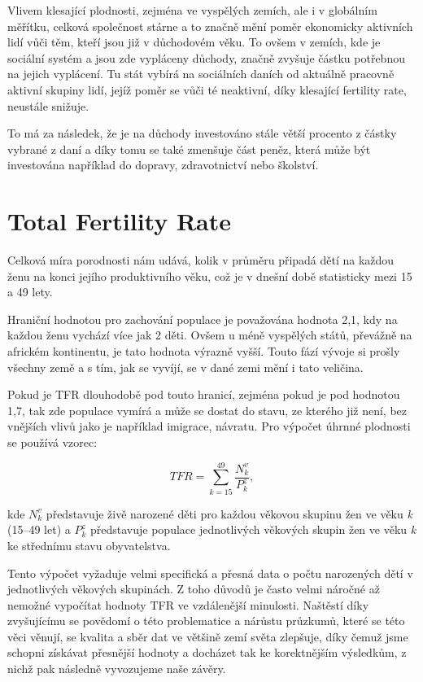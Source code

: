 \documentclass[thesis=M,czech]{FITthesis}[2022/10/08]
\begin{document}
Vlivem klesající plodnosti, zejména ve vyspělých zemích, ale i v globálním měřítku, celková společnost stárne a to značně mění poměr ekonomicky aktivních lidí vůči těm, kteří jsou již v důchodovém věku. To ovšem v zemích, kde je sociální systém a jsou zde vypláceny důchody, značně zvyšuje částku potřebnou na jejich vyplácení. Tu stát vybírá na sociálních daních od aktuálně pracovně aktivní skupiny lidí, jejíž poměr se vůči té neaktivní, díky klesající fertility rate, neustále snižuje. 

To má za následek, že je na důchody investováno stále větší procento z částky vybrané z daní a díky tomu se také zmenšuje část peněz, která může být investována například do dopravy, zdravotnictví nebo školství.

\section{Total Fertility Rate}

Celková míra porodnosti nám udává, kolik v průměru připadá dětí na každou ženu na konci jejího produktivního věku, což je v dnešní době statisticky mezi 15 a 49 lety.

Hraniční hodnotou pro zachování populace je považována hodnota 2,1, kdy na každou ženu vychází více jak 2 děti. Ovšem u méně vyspělých států, převážně na africkém kontinentu, je tato hodnota výrazně vyšší. Touto fází vývoje si prošly všechny země a s tím, jak se vyvíjí, se v dané zemi mění i tato veličina. 

Pokud je TFR dlouhodobě pod touto hranicí, zejména pokud je pod hodnotou 1,7, tak zde populace vymírá a může se dostat do stavu, ze kterého již není, bez vnějších vlivů jako je například imigrace, návratu.
Pro výpočet úhrnné plodnosti se používá vzorec:

\[ TFR = \sum_{k=15}^{49} \frac{N^v_k}{P^z_k},\] 

kde $N_k^v$  představuje živě narozené děti pro každou věkovou skupinu žen ve věku \textit{k} (15–49 let) a $P_k^z$ představuje populace jednotlivých věkových skupin žen ve věku \textit{k} ke střednímu stavu obyvatelstva.

Tento výpočet vyžaduje velmi specifická a přesná data o počtu narozených dětí v jednotlivých věkových skupinách. Z toho důvodů je často velmi náročné až nemožné vypočítat hodnoty TFR ve vzdálenější minulosti. Naštěstí díky zvyšujícímu se povědomí o této problematice a nárůstu průzkumů, které se této věci věnují, se kvalita a sběr dat ve většině zemí světa zlepšuje, díky čemuž jsme schopni získávat přesnější hodnoty a docházet tak ke korektnějším výsledkům, z nichž pak následně vyvozujeme naše závěry. \cite{UN-TFR}
\end{document}
